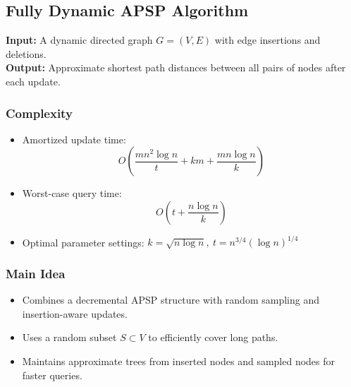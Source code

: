 \documentclass{report}
\begin{document}
\subsection*{Fully Dynamic APSP Algorithm}

\textbf{Input:} A dynamic directed graph \( G = (V, E) \) with edge insertions and deletions.\\
\textbf{Output:} Approximate shortest path distances between all pairs of nodes after each update.

\subsubsection*{Complexity}
\begin{itemize}
    \item Amortized update time: 
    \[
    O\left(\frac{mn^2 \log n}{t} + km + \frac{mn \log n}{k}\right)
    \]
    \item Worst-case query time:
    \[
    O\left(t + \frac{n \log n}{k}\right)
    \]
    \item Optimal parameter settings: \(k = \sqrt{n \log n},\ t = n^{3/4} (\log n)^{1/4}\)
\end{itemize}

\subsubsection*{Main Idea}
\begin{itemize}
    \item Combines a decremental APSP structure with random sampling and insertion-aware updates.
    \item Uses a random subset \( S \subset V \) to efficiently cover long paths.
    \item Maintains approximate trees from inserted nodes and sampled nodes for faster queries.
\end{itemize}
\end{document}
